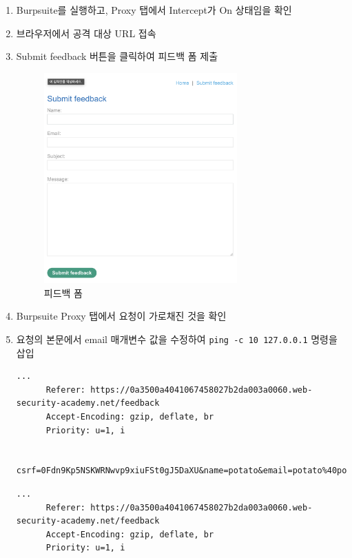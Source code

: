 \documentclass{article}
\begin{document}
\begin{description}
    \begin{enumerate}
      \item Burpsuite를 실행하고, Proxy 탭에서 Intercept가 On 상태임을 확인
      \item 브라우저에서 공격 대상 URL 접속
      \item Submit feedback 버튼을 클릭하여 피드백 폼 제출
      \begin{figure}[htbp]
      \centering
      \includegraphics[width=0.7\textwidth]{../figure/figure3.png}
      \caption{피드백 폼}
      \label{fig:feedback-form}
      \end{figure}
      \item Burpsuite Proxy 탭에서 요청이 가로채진 것을 확인
      \item 요청의 본문에서 email 매개변수 값을 수정하여 \texttt{ping -c 10 127.0.0.1} 명령을 삽입
      \begin{lstlisting}[label={lst:blind-original-request},caption={원본 요청 (original request)}]
      ...
      Referer: https://0a3500a4041067458027b2da003a0060.web-security-academy.net/feedback
      Accept-Encoding: gzip, deflate, br
      Priority: u=1, i

      csrf=0Fdn9Kp5NSKWRNwvp9xiuFSt0gJ5DaXU&name=potato&email=potato%40potato.com&subject=potato&message=potato
      \end{lstlisting}

      \begin{lstlisting}[label={lst:modified-request},caption={변동된 요청 (modified request)}]
      ...
      Referer: https://0a3500a4041067458027b2da003a0060.web-security-academy.net/feedback
      Accept-Encoding: gzip, deflate, br
      Priority: u=1, i


\end{lstlisting}
\end{enumerate}
\end{description}
\end{document}

